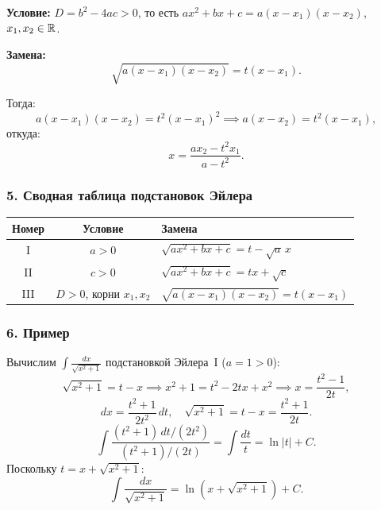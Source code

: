 \textbf{Условие:} $D = b^2-4ac > 0$, то есть $ax^2+bx+c = a(x-x_1)(x-x_2)$, $x_1, x_2 \in \mathbb{R}$.

\textbf{Замена:}
\[ \sqrt{a(x-x_1)(x-x_2)} = t(x - x_1). \]

Тогда:
\[
a(x-x_1)(x-x_2) = t^2(x-x_1)^2 \implies a(x-x_2) = t^2(x-x_1),
\]
откуда:
\[
x = \frac{ax_2 - t^2 x_1}{a - t^2}.
\]

\subsubsection*{5. Сводная таблица подстановок Эйлера}

\begin{center}
\renewcommand{\arraystretch}{2.0}
\begin{tabular}{|c|c|l|}
\hline
\textbf{Номер} & \textbf{Условие} & \textbf{Замена} \\
\hline
I   & $a > 0$ & $\sqrt{ax^2+bx+c} = t - \sqrt{a}\,x$ \\
II  & $c > 0$ & $\sqrt{ax^2+bx+c} = tx + \sqrt{c}$ \\
III & $D > 0$, корни $x_1, x_2$ & $\sqrt{a(x-x_1)(x-x_2)} = t(x-x_1)$ \\
\hline
\end{tabular}
\end{center}

\subsubsection*{6. Пример}

Вычислим $\displaystyle\int \frac{dx}{\sqrt{x^2+1}}$ подстановкой Эйлера~I ($a=1>0$):
\[
\sqrt{x^2+1} = t - x \implies x^2+1 = t^2-2tx+x^2 \implies x = \frac{t^2-1}{2t},
\]
\[
dx = \frac{t^2+1}{2t^2}\,dt, \quad \sqrt{x^2+1} = t - x = \frac{t^2+1}{2t}.
\]
\[
\int\frac{(t^2+1)\,dt/(2t^2)}{(t^2+1)/(2t)} = \int\frac{dt}{t} = \ln|t|+C.
\]
Поскольку $t = x + \sqrt{x^2+1}$:
\[
\int \frac{dx}{\sqrt{x^2+1}} = \ln\!\left(x+\sqrt{x^2+1}\right)+C.
\]